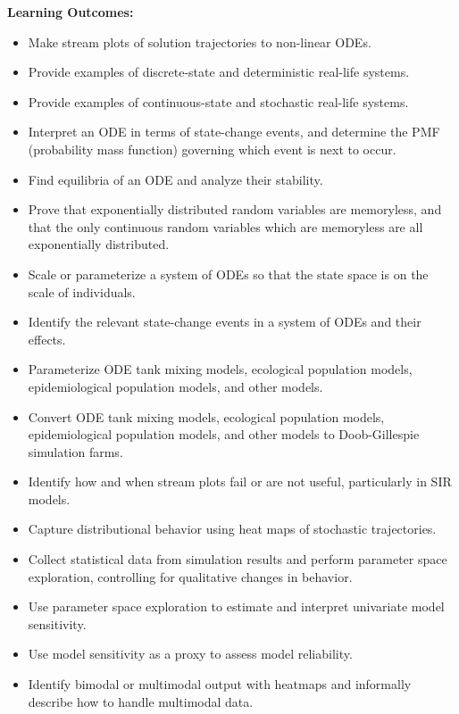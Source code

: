 \noindent \textbf{Learning Outcomes:}
\begin{itemize}
\item Make stream plots of solution trajectories to non-linear ODEs.
\item Provide examples of discrete-state and deterministic real-life systems.
\item Provide examples of continuous-state and stochastic real-life systems.
\item Interpret an ODE in terms of state-change events, and determine the PMF (probability mass function) governing which event is next to occur.
\item Find equilibria of an ODE and analyze their stability.
\item Prove that exponentially distributed random variables are memoryless, and that the only continuous random variables which are memoryless are all exponentially distributed.
\item Scale or parameterize a system of ODEs so that the state space is on the scale of individuals.
\item Identify the relevant state-change events in a system of ODEs and their effects.
\item Parameterize ODE tank mixing models, ecological population models, epidemiological population models, and other models.
\item Convert ODE tank mixing models, ecological population models, epidemiological population models, and other models to Doob-Gillespie simulation farms.
\item Identify how and when stream plots fail or are not useful, particularly in SIR models.
\item Capture distributional behavior using heat maps of stochastic trajectories.
\item Collect statistical data from simulation results and perform parameter space exploration, controlling for qualitative changes in behavior.
\item Use parameter space exploration to estimate and interpret univariate model sensitivity.
\item Use model sensitivity as a proxy to assess model reliability.
\item Identify bimodal or multimodal output with heatmaps and informally describe how to handle multimodal data.
\end{itemize}
